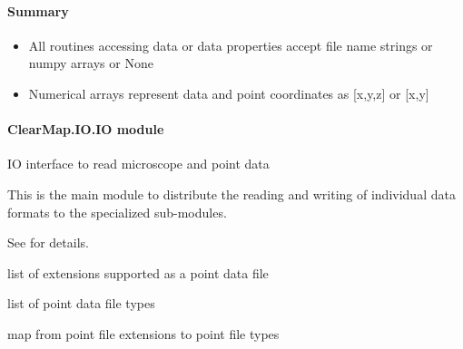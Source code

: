 \documentclass[letterpaper,10pt,english]{sphinxmanual}
\begin{document}
\paragraph{Summary}
\label{api/ClearMap.IO:summary}\begin{itemize}
\item {} 
All routines accessing data or data properties accept file name strings or numpy arrays or None

\item {} 
Numerical arrays represent data and point coordinates as {[}x,y,z{]} or {[}x,y{]}

\end{itemize}


\paragraph{ClearMap.IO.IO module}
\label{api/ClearMap.IO:clearmap-io-io-module}\label{api/ClearMap.IO:module-ClearMap.IO.IO}
IO interface to read microscope and point data

This is the main module to distribute the reading and writing of individual data formats to the specialized sub-modules.

See {\hyperref[api/ClearMap.IO:module-ClearMap.IO]{\emph{}}} for details.

\begin{fulllineitems}
\label{api/ClearMap.IO:ClearMap.IO.IO.pointFileExtensions}
list of extensions supported as a point data file

\end{fulllineitems}


\begin{fulllineitems}
\label{api/ClearMap.IO:ClearMap.IO.IO.pointFileTypes}
list of point data file types

\end{fulllineitems}


\begin{fulllineitems}
\label{api/ClearMap.IO:ClearMap.IO.IO.pointFileExtensionToType}
map from point file extensions to point file types

\end{fulllineitems}
\end{document}
